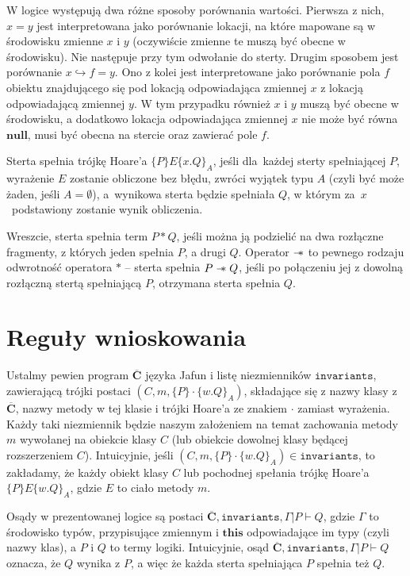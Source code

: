 \documentclass[]{pracamgr}
\newcommand \wand {\mathrel{-\mkern-6mu*}}
\newcommand \hoare [5] {\{#1\}#2\{#4.#5\}_#3}
\renewcommand \| {\hspace{0.75em} | \hspace{0.75em} }
\renewcommand \[ {[\![}
\renewcommand \] {]\!]}
\theoremstyle{definition}
\newcommand{\jnull}{\mathbf{null}\xspace}
\newcommand{\jthis}{\textbf{this}\xspace}
\begin{document}
W logice występują dwa różne sposoby porównania wartości. Pierwsza z nich, $x = y$ jest interpretowana
jako porównanie lokacji, na które mapowane są w środowisku zmienne $x$ i $y$
(oczywiście zmienne te muszą być obecne w środowisku).
Nie następuje przy tym odwołanie do sterty. Drugim sposobem jest porównanie
$x \hookrightarrow f = y$. Ono z kolei jest interpretowane jako porównanie pola $f$ obiektu znajdującego
się pod lokacją odpowiadająca zmiennej $x$ z lokacją odpowiadającą zmiennej $y$. W tym przypadku
również $x$ i $y$ muszą być obecne w środowisku, a dodatkowo lokacja odpowiadająca zmiennej $x$
nie może być równa $\jnull$, musi być obecna na stercie oraz zawierać pole $f$.

Sterta spełnia trójkę Hoare'a $\hoare{P}{E}{A}{x}{Q}$, jeśli dla~każdej sterty spełniającej
$P$, wyrażenie $E$ zostanie obliczone bez błędu, zwróci wyjątek typu $A$
(czyli być może żaden, jeśli $A = \emptyset$),
a~wynikowa sterta będzie
spełniała $Q$, w którym za~$x$~podstawiony zostanie wynik obliczenia.

Wreszcie, sterta spełnia term $P * Q$, jeśli można ją podzielić na dwa rozłączne fragmenty, z których
jeden spełnia $P$, a drugi $Q$.
Operator $\wand$ to pewnego rodzaju odwrotność operatora $*$ -- sterta spełnia $P \wand Q$, jeśli
po połączeniu jej z dowolną rozłączną stertą spełniającą $P$, otrzymana sterta spełnia $Q$.

\chapter{Reguły wnioskowania}
\label{chap:rules}
Ustalmy pewien program \(\overline{\mathbf{C}}\) języka Jafun i
listę niezmienników $\mathtt{invariants}$, zawierającą trójki postaci
$(C, m, \hoare{P}{\cdot}{A}{w}{Q})$, składające się z nazwy klasy z \(\overline{\mathbf{C}}\),
nazwy metody w tej klasie i trójki Hoare'a ze znakiem $\cdot$ zamiast wyrażenia.
Każdy taki niezmiennik będzie naszym założeniem na temat zachowania metody $m$ wywołanej na
obiekcie klasy $C$ (lub obiekcie dowolnej klasy będącej rozszerzeniem $C$).
Intuicyjnie, jeśli $(C, m, \hoare{P}{\cdot}{A}{w}{Q}) \in \mathtt{invariants}$,
to zakładamy, że każdy obiekt klasy $C$ lub pochodnej spełania trójkę Hoare'a
$\hoare{P}{E}{A}{w}{Q}$, gdzie $E$ to ciało metody $m$.

Osądy w prezentowanej logice są postaci
$\overline{\mathbf{C}}, \mathtt{invariants}, \Gamma | P \vdash Q$, gdzie $\Gamma$ to środowisko typów,
przypisujące zmiennym i $\jthis$ odpowiadające im typy (czyli nazwy klas), a $P$ i $Q$ to termy logiki.
Intuicyjnie, osąd $\overline{\mathbf{C}}, \mathtt{invariants}, \Gamma | P \vdash Q$
oznacza, że $Q$ wynika z $P$, a więc że każda sterta spełniająca
$P$ spełnia też $Q$.
\end{document}
